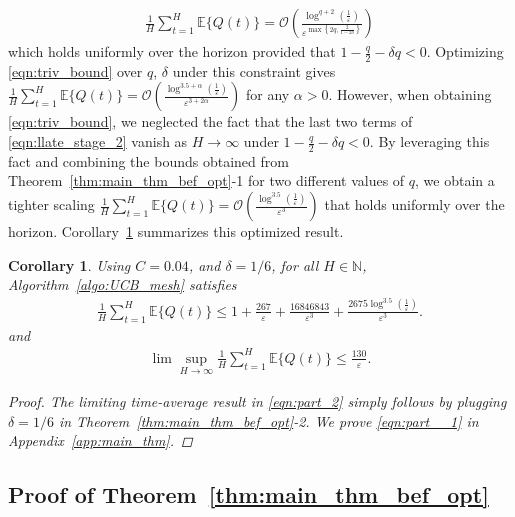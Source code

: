 \documentclass[12pt,draftcls, onecolumn]{IEEEtran}
\newtheorem{corollary}{Corollary}[theorem]
\begin{document}
\begin{align}\label{eqn:triv_bound}
    \frac{1}{H}\sum_{t = 1}^H \mathbb{E}\{Q(t)\} = \mathcal{O}\left(\frac{\log^{q+2}\left(\frac{1}{\varepsilon}\right)}{\varepsilon^{\max\left\{2q,\frac{2}{1-2\delta}\right\}}}\right)
\end{align}
which holds uniformly over the horizon provided that $1-\frac{q}{2}-\delta q < 0$. Optimizing \eqref{eqn:triv_bound} over $q$, $\delta$ under this constraint gives $\frac{1}{H}\sum_{t = 1}^H \mathbb{E}\{Q(t)\} = \mathcal{O}\left(\frac{\log^{3.5+\alpha}\left(\frac{1}{\varepsilon}\right)}{\varepsilon^{3+2\alpha}}\right)$ for any $\alpha >0$. However, when obtaining \eqref{eqn:triv_bound}, we neglected the fact that the last two terms of \eqref{eqn:llate_stage_2} vanish as $H \rightarrow \infty$ under $1-\frac{q}{2}-\delta q < 0$. By leveraging this fact and combining the bounds obtained from Theorem~\ref{thm:main_thm_bef_opt}-1 for two different values of $q$, we obtain a tighter scaling $\frac{1}{H}\sum_{t = 1}^H \mathbb{E}\{Q(t)\} = \mathcal{O}\left(\frac{\log^{3.5}\left(\frac{1}{\varepsilon}\right)}{\varepsilon^{3}}\right)$ that holds uniformly over the horizon. Corollary~\ref{thm:main_thm} summarizes this optimized result.
\begin{corollary}\label{thm:main_thm}
     Using $C = 0.04$, and $\delta = 1/6$, for all $H \in \mathbb{N}$, Algorithm~\ref{algo:UCB_mesh} satisfies
        \begin{align}\label{eqn:part__1}
            \frac{1}{H}\sum_{t=1}^{H} \mathbb{E}\{Q(t)\} \leq1 + \frac{267}{\varepsilon} +\frac{16846843}{\varepsilon^3} + \frac{2675\log^{3.5}\left(\frac{1}{\varepsilon}\right)}{\varepsilon^3}. 
        \end{align} 
        and
        \begin{align}\label{eqn:part_2}
              \lim\sup_{H \to \infty}\frac{1}{H}\sum_{t = 1}^H \mathbb{E}\{Q(t)\} \leq  \frac{130}{\varepsilon}.
        \end{align}
    \begin{proof}
        The limiting time-average result in \eqref{eqn:part_2} simply follows by plugging $\delta = 1/6$ in Theorem~\ref{thm:main_thm_bef_opt}-2. We prove \eqref{eqn:part__1} in Appendix~\ref{app:main_thm}. 
    \end{proof}
\end{corollary}

\subsection{Proof of Theorem~\ref{thm:main_thm_bef_opt}}\label{sec:analysis}
\end{document}
